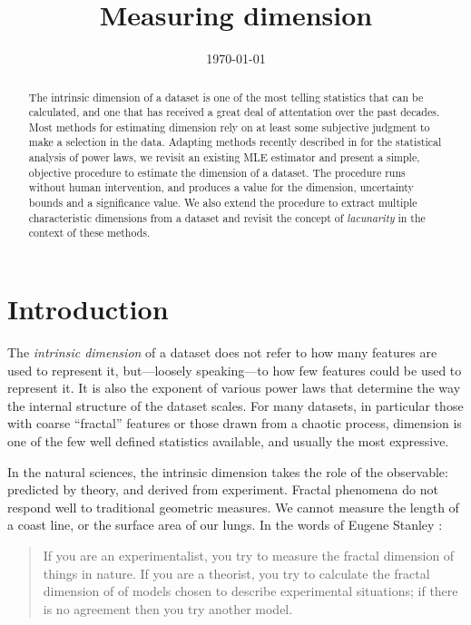 \documentclass[11pt]{article}
\title{Measuring dimension}
\date{\today}
\begin{document}
\maketitle

\begin{abstract}
\noindent The intrinsic dimension of a dataset is one of the most telling statistics that can be calculated, and one that has received a great deal of attentation over the past decades. Most methods for estimating dimension rely on at least some subjective judgment to make a selection in the data. Adapting methods recently described in \cite{clauset2007power} for the statistical analysis of power laws, we revisit an existing MLE estimator and present a simple, objective procedure to estimate the dimension of a dataset. The procedure runs without human intervention, and produces a value for the dimension, uncertainty bounds and a significance value. We also extend the procedure to extract multiple characteristic dimensions from a dataset and revisit the concept of \textit{lacunarity} in the context of these methods.\end{abstract}
\section{Introduction}
The \textit{intrinsic dimension} of a dataset does not refer to how many features are used to represent it, but---loosely speaking---to how few features could be used to represent it. It is also the exponent of various power laws that determine the way the internal structure of the dataset scales. For many datasets, in particular those with coarse ``fractal'' features or those drawn from a chaotic process, dimension is one of the few well defined statistics available, and usually the most expressive.

In the natural sciences, the intrinsic dimension takes the role of the observable: predicted by theory, and derived from experiment. Fractal phenomena do not respond well to traditional geometric measures. We cannot measure the length of a coast line, or the surface area of our lungs. In the words of Eugene Stanley \cite{stanley1986growth}:

\begin{quotation}
\small
\noindent If you are an experimentalist, you try to measure the fractal dimension of things in nature. If you are a theorist, you try to calculate the fractal dimension of of models chosen to describe experimental situations; if there is no agreement then you try another model.
\end{quotation}
\end{document}
